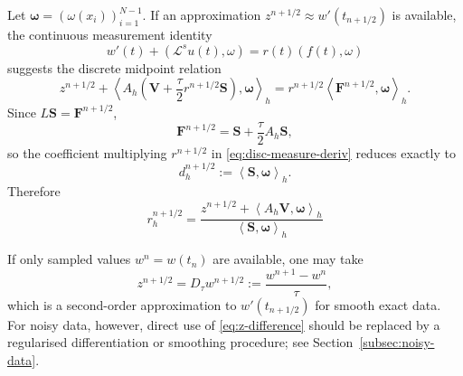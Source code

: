 \documentclass[reqno]{amsart}
\newcommand{\Lcal}{\mathcal L}
\newcommand{\Ah}{A_h}
\newcommand{\ip}[2]{\left\langle #1,#2\right\rangle_h}
\begin{document}
Let $\boldsymbol\omega=(\omega(x_i))_{i=1}^{N-1}$. If an approximation
$z^{n+1/2}\approx w'(t_{n+1/2})$ is available, the continuous measurement identity
\[
 w'(t)+(\Lcal^s u(t),\omega)=r(t)(f(t),\omega)
\]
suggests the discrete midpoint relation
\begin{equation}\label{eq:disc-measure-deriv}
 z^{n+1/2}
 +\ip{\Ah\left(\mathbf V+\frac\tau2r^{n+1/2}\mathbf S\right)}{\boldsymbol\omega}
 =r^{n+1/2}\ip{\mathbf F^{n+1/2}}{\boldsymbol\omega}.
\end{equation}
Since $L\mathbf S=\mathbf F^{n+1/2}$,
\begin{equation}\label{eq:den-simplify}
 \mathbf F^{n+1/2}=\mathbf S+\frac\tau2\Ah\mathbf S,
\end{equation}
so the coefficient multiplying $r^{n+1/2}$ in \eqref{eq:disc-measure-deriv} reduces exactly to
\begin{equation}\label{eq:d-h}
 d_h^{n+1/2}:=\ip{\mathbf S}{\boldsymbol\omega}.
\end{equation}
Therefore
\begin{equation}\label{eq:r-closed}
 r_h^{n+1/2}
 =\frac{z^{n+1/2}+\ip{\Ah\mathbf V}{\boldsymbol\omega}}
 {\ip{\mathbf S}{\boldsymbol\omega}}
\end{equation}

If only sampled values $w^n=w(t_n)$ are available, one may take
\begin{equation}\label{eq:z-difference}
 z^{n+1/2}=D_\tau w^{n+1/2}:=\frac{w^{n+1}-w^n}{\tau},
\end{equation}
which is a second-order approximation to $w'(t_{n+1/2})$ for smooth exact data. For noisy data, however, direct use of \eqref{eq:z-difference} should be replaced by a regularised differentiation or smoothing procedure; see Section~\ref{subsec:noisy-data}.
\end{document}
